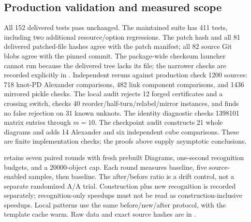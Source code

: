 \subsection{Production validation and measured scope}
All 152 delivered tests pass unchanged.  The maintained suite has 411 tests,
including two additional resource/option regressions.  The patch hash and all
81 delivered patched-file hashes agree with the patch manifest; all 82 source
Git blobs agree with the pinned commit.  The package-wide checksum launcher
cannot run because the delivered tree lacks its  file;
the narrower checks are recorded explicitly in .
Independent reruns
against production check 1200 sources: 718 knot-PD Alexander comparisons,
482 link component comparisons, and 1436 mirrored pickle checks.  The local
audit rejects 12 forged certificates and a crossing switch, checks 40
reorder/half-turn/relabel/mirror instances, and finds no false rejection on
31 known unknots.  The identity diagnostic checks 1398101 matrix entries
through $m=10$.  The checkpoint audit constructs 21 whole diagrams and adds
14 Alexander and six independent cube comparisons.  These are finite
implementation checks; the proofs above supply asymptotic conclusions.

 retains seven paired rounds
with fresh prebuilt Diagrams, one-second recognition budgets, and a 20000-object
cap.  Each round measures baseline, five source-enabled samples, then baseline.
The after/before ratio is a drift control, not a separate randomized A/A trial.
Construction plus new recognition is recorded separately; recognition-only
speedups must not be read as construction-inclusive speedups.  Local patterns
use the same before/new/after protocol, with the template cache warm.
Raw data and exact source hashes are in
.

